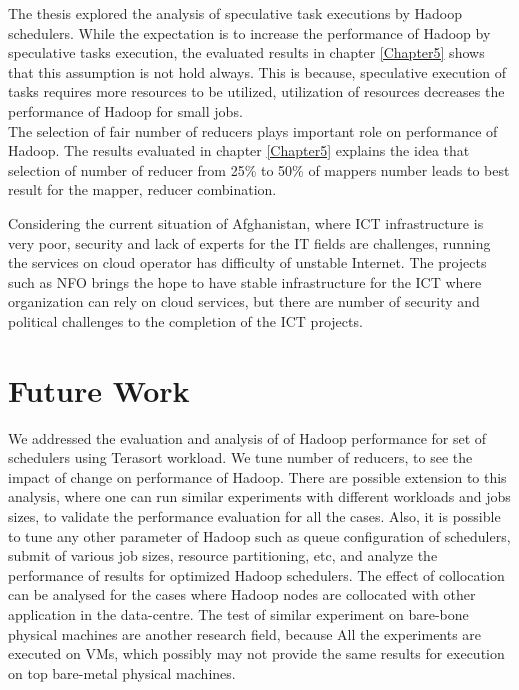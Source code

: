  The thesis explored the analysis of speculative task executions by Hadoop schedulers. While the expectation is to increase the performance of Hadoop by speculative tasks execution, the evaluated results in chapter \ref{Chapter5} shows that this assumption is not hold always. This is because, speculative execution of tasks requires more resources to be utilized, utilization of resources decreases the performance of Hadoop for small jobs.   \\
 
 The selection of fair number of reducers plays important role on performance of Hadoop. The results evaluated in chapter \ref{Chapter5} explains the idea that selection of number of reducer from 25\% to 50\% of mappers number leads to best result for the mapper, reducer combination.  
 
 
 Considering the current situation of Afghanistan, where ICT infrastructure is very poor, security and lack of experts for the IT‌ fields are challenges, running the services on cloud operator has difficulty of unstable Internet. The projects such as NFO‌ brings the hope to have stable infrastructure for the ICT where organization can rely on cloud services, but there are number of security and political challenges to the completion of the ICT‌ projects.  

\section{Future Work}

 We addressed the evaluation and analysis of of Hadoop performance for set of schedulers using Terasort workload. We tune number of reducers, to see the impact of change on performance of Hadoop. There are possible extension to this analysis, where one can run similar experiments with different workloads and jobs sizes, to validate the performance evaluation for all the cases. Also, it is possible to tune any other parameter of Hadoop such as queue configuration of schedulers, submit of various job sizes, resource partitioning, etc, and analyze the performance of results for optimized Hadoop schedulers. The effect of collocation can be analysed for the cases where Hadoop nodes are collocated with other application in the data-centre. The test of similar experiment on bare-bone physical machines are another research field, because All the experiments are executed on VMs, which possibly may not provide the same results for execution on top bare-metal physical machines.



